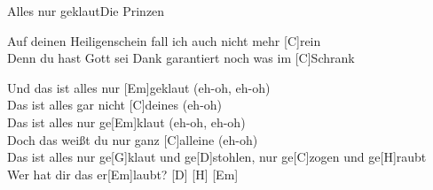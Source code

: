 \begin{song}{Alles nur geklaut}{Die Prinzen}

    \begin{bridge}
        [Em] Auf deinen Heiligenschein fall ich auch nicht mehr [C]rein \\
        [Em]Denn du hast Gott sei Dank garantiert noch was im [C]Schrank 
    \end{bridge}

    \begin{chorus}  
        Und das ist alles nur [Em]geklaut (eh-oh, eh-oh) \\
        Das ist alles gar nicht [C]deines (eh-oh) \\
        Das ist alles nur ge[Em]klaut (eh-oh, eh-oh) \\
        Doch das weißt du nur ganz [C]alleine (eh-oh) \\
        Das ist alles nur ge[G]klaut und ge[D]stohlen, nur ge[C]zogen und ge[H]raubt \\
        Wer hat dir das er[Em]laubt? [D] \hspace{1em} [H] \hspace{1em} [Em]
    \end{chorus}  

\end{song}
